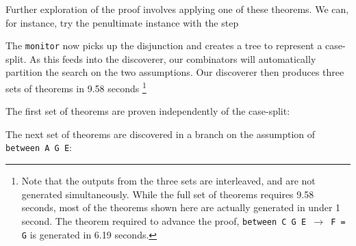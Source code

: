 Further exploration of the proof involves applying one of these theorems. We can, for instance, try the penultimate instance with the step

\vspace{0.2cm}
\noindent{}
\vspace{0.1cm}


The \texttt{monitor} now picks up the disjunction and creates a tree to represent a case-split. As this feeds into the discoverer, our combinators will automatically partition the search on the two assumptions. Our discoverer then produces three sets of theorems in 9.58 seconds \footnote{Note that the outputs from the three sets are interleaved, and are not generated simultaneously. While the full set of theorems requires 9.58 seconds, most of the theorems shown here are actually generated in under 1 second. The theorem required to advance the proof, \texttt{between C G E $\rightarrow$ F = G} is generated in 6.19 seconds.}

The first set of theorems are proven independently of the case-split:

\vspace{0.2cm}
\noindent{}
\vspace{0.1cm}

The next set of theorems are discovered in a branch on the assumption of \texttt{between A G E}:

\vspace{0.2cm}
\noindent{}
\vspace{0.1cm}

